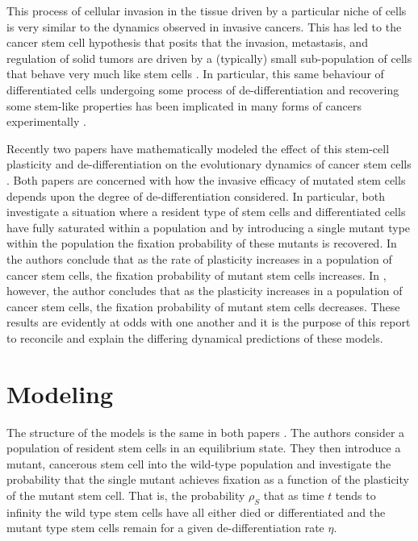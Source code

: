 \documentclass[12pt]{article}
\begin{document}
This process of cellular invasion in the tissue driven by a particular niche of cells is very similar to the dynamics observed in invasive cancers. This has led to the cancer stem cell hypothesis that posits that the invasion, metastasis, and regulation of solid tumors are driven by a (typically) small sub-population of cells that behave very much like stem cells \cite{moh3, moh4, moh5, moh6}. In particular, this same behaviour of differentiated cells undergoing some process of de-differentiation and recovering some stem-like properties has been implicated in many forms of cancers experimentally \cite{moh23, moh24, moh25, moh26}.

Recently two papers have mathematically modeled the effect of this stem-cell plasticity and de-differentiation on the evolutionary dynamics of cancer stem cells \cite{mohammad,wodarz}. Both papers are concerned with how the invasive efficacy of mutated stem cells depends upon the degree of de-differentiation considered. In particular, both investigate a situation where a resident type of stem cells and differentiated cells have fully saturated within a population and by introducing a single mutant type within the population the fixation probability of these mutants is recovered. In \cite{mohammad} the authors conclude that as the rate of plasticity increases in a population of cancer stem cells, the fixation probability of mutant stem cells increases. In \cite{wodarz}, however, the author concludes that as the plasticity increases in a population of cancer stem cells, the fixation probability of mutant stem cells decreases. These results are evidently at odds with one another and it is the purpose of this report to reconcile and explain the differing dynamical predictions of these models.

\section{Modeling}

The structure of the models is the same in both papers \cite{mohammad, wodarz}. The authors consider a population of resident stem cells in an equilibrium state. They then introduce a mutant, cancerous stem cell into the wild-type population and investigate the probability that the single mutant achieves fixation as a function of the plasticity of the mutant stem cell. That is, the probability $\rho_S$ that as time $t$ tends to infinity the wild type stem cells have all either died or differentiated and the mutant type stem cells remain for a given de-differentiation rate $\eta$.
\end{document}
